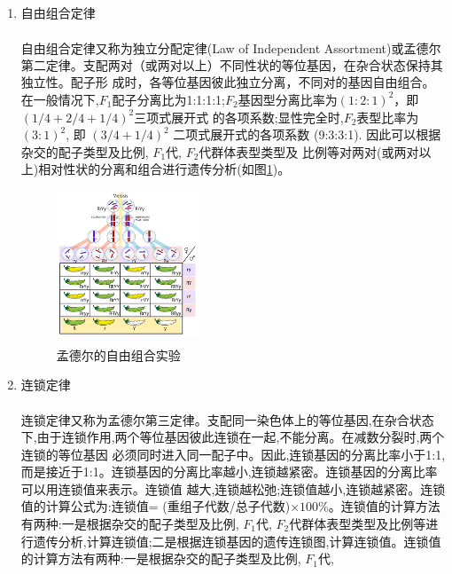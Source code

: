 \documentclass[AutoFakeBold]{LZUThesis}
\newcommand{\upcite}[1]{\textsuperscript{\textsuperscript{\cite{#1}}}}
\begin{document}
\begin{enumerate}[start=2]
\item 自由组合定律\par
\hspace{2em}自由组合定律\upcite{mendel1996}又称为独立分配定律(Law of Independent Assortment)或孟德尔第二定律。支配两对（或两对以上）不同性状的等位基因，在杂合状态保持其独立性。配子形
成时，各等位基因彼此独立分离，不同对的基因自由组合。在一般情况下,$F_1$配子分离比为1:1:1:1;$F_2$基因型分离比率为$(1:2:1)^2$，即$(1/4+2/4+1/4)^2$三项式展开式
的各项系数;显性完全时,$F_2$表型比率为$(3:1)^2$, 即 $(3/4 + 1/4)^2$ 二项式展开式的各项系数 (9:3:3:1). 
因此可以根据杂交的配子类型及比例, $F_1$代, $F_2$代群体表型类型及
比例等对两对(或两对以上)相对性状的分离和组合进行遗传分析(如图\ref{fig:2})。

\begin{figure}[h]
    \centering
    \includegraphics[width=0.4\textwidth]{img/Independent_assortment_&_segregation}
    \caption{孟德尔的自由组合实验\upcite{wiki:mendelimg}}
    \label{fig:2}
\end{figure}

\item 连锁定律\par
\hspace{2em}连锁定律\upcite{morgan1917}又称为孟德尔第三定律。支配同一染色体上的等位基因,在杂合状态下,由于连锁作用,两个等位基因彼此连锁在一起,不能分离。在减数分裂时,两个连锁的等位基因
必须同时进入同一配子中。因此,连锁基因的分离比率小于1:1,而是接近于1:1。连锁基因的分离比率越小,连锁越紧密。连锁基因的分离比率可以用连锁值来表示。连锁值
越大,连锁越松弛;连锁值越小,连锁越紧密。连锁值的计算公式为:连锁值= (重组子代数/总子代数)$\times 100\%$。连锁值的计算方法有两种:一是根据杂交的配子类型及比例, $F_1$代,
$F_2$代群体表型类型及比例等进行遗传分析,计算连锁值;二是根据连锁基因的遗传连锁图,计算连锁值。连锁值的计算方法有两种:一是根据杂交的配子类型及比例, $F_1$代,

\end{enumerate}
\end{document}
